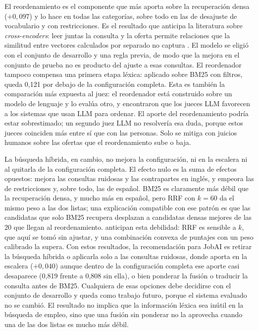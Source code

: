 El reordenamiento es el componente que más aporta sobre la recuperación densa ($+0{,}097$) y lo hace en todas las categorías, sobre todo en las de desajuste de vocabulario y con restricciones. Es el resultado que anticipa la literatura sobre \textit{cross-encoders}: leer juntas la consulta y la oferta permite relaciones que la similitud entre vectores calculados por separado no captura \citep{Nogueira2019}. El modelo se eligió con el conjunto de desarrollo y una regla previa, de modo que la mejora en el conjunto de prueba no es producto del ajuste a esas consultas. El reordenador tampoco compensa una primera etapa léxica: aplicado sobre BM25 con filtros, queda 0,121 por debajo de la configuración completa. Esta es también la comparación más expuesta al juez: el reordenador está construido sobre un modelo de lenguaje y lo evalúa otro, y \citet{Frobe2025} encontraron que los jueces LLM favorecen a los sistemas que usan LLM para ordenar. El aporte del reordenamiento podría estar sobrestimado; un segundo juez LLM no resolvería esa duda, porque estos jueces coinciden más entre sí que con las personas. Solo se mitiga con juicios humanos sobre las ofertas que el reordenamiento sube o baja.

La búsqueda híbrida, en cambio, no mejora la configuración, ni en la escalera ni al quitarla de la configuración completa. El efecto nulo es la suma de efectos opuestos: mejora las consultas ruidosas y las contrapartes en inglés, y empeora las de restricciones y, sobre todo, las de español. BM25 es claramente más débil que la recuperación densa, y mucho más en español, pero RRF con $k = 60$ da el mismo peso a las dos listas; una explicación compatible con ese patrón es que las candidatas que solo BM25 recupera desplazan a candidatas densas mejores de las 20 que llegan al reordenamiento. \citet{Bruch2023} anticipan esta debilidad: RRF es sensible a $k$, que aquí se tomó sin ajustar, y una combinación convexa de puntajes con un peso calibrado la supera. Con estos resultados, la recomendación para JobAI es retirar la búsqueda híbrida o aplicarla solo a las consultas ruidosas, donde aporta en la escalera ($+0{,}040$) aunque dentro de la configuración completa ese aporte casi desaparece (0,819 frente a 0,808 sin ella), o bien ponderar la fusión o traducir la consulta antes de BM25. Cualquiera de esas opciones debe decidirse con el conjunto de desarrollo y queda como trabajo futuro, porque el sistema evaluado no se cambió. El resultado no implica que la información léxica sea inútil en la búsqueda de empleo, sino que una fusión sin ponderar no la aprovecha cuando una de las dos listas es mucho más débil.

